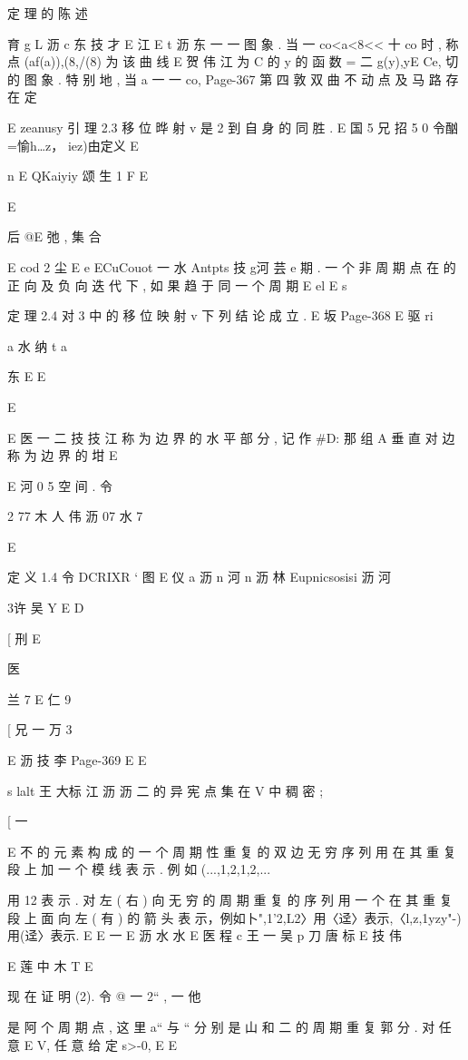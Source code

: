 {{{{{{{{{{{{{{{{{{定 理 的 陈 述

育 g
L 沥 c 东 技 才
E 江
E t 沥 东 一 一
图 象 . 当 一 co<a<8<< 十 co 时 , 称 点 (af(a)),(8,/(8) 为 该 曲 线
E 贺 伟 江
为 C 的 y 的 函 数 = 二 g(y),yE Ce, 切 的 图 象 . 特 别 地 , 当 a 一 一 co,
Page-367
第 四 敦 双 曲 不 动 点 及 马 路 存 在 定

E
zeanusy
引 理 2.3 移 位 晔 射 v 是 2 到 自 身 的 同 胜 .
E 国 5 兄 招 5
0
令酗=愉h…z， iez)由定义
E

n
E
QKaiyiy 颂 生 1
F
E

E

后 @E 弛 , 集 合

E cod 2 尘
E e
ECuCouot 一 水 Antpts 技 g河 芸 e
期 . 一 个 非 周 期 点 在 的 正 向 及 负 向 迭 代 下 , 如 果 趋 于 同 一 个 周 期
E el E
s

定 理 2.4 对 3 中 的 移 位 映 射 v 下 列 结 论 成 立 .
E 坂
Page-368
E 驱 ri

a 水 纳 t a

东
E
E

E

E 医 一 二 技
技 江
称 为 边 界 的 水 平 部 分 , 记 作 #D: 那 组 A 垂 直 对 边 称 为 边 界 的 坩
E

E 河 0 5
空 间 . 令

2 77 木 人 伟
沥 07 水 7

E

定 义 1.4 令 DCRIXR ` 图
E 仪 a 沥 n 河
n 沥 林
Eupnicsosisi 沥 河

3许 吴
Y E D

[ 刑
E

医

兰 7
E 仁 9

[ 兄 一 万 3

E 沥 技
李
Page-369
E E

s lalt 王 大标 江 沥 沥 二
的 异 宪 点 集 在 V 中 稠 密 ;

[ 一

E 不
的 元 素 构 成 的 一 个 周 期 性 重 复 的 双 边 无 穷 序 列 用 在 其 重 复 段 上 加
一 个 模 线 表 示 . 例 如 (...,1,2,1,2,...} 用 {12} 表 示 . 对 左 ( 右 ) 向 无
穷 的 周 期 重 复 的 序 列 用 一 个 在 其 重 复 段 上 面 向 左 ( 有 ) 的 箭 头 表
示，例如卜",1'2,L2〉用〈迳〉表示,〈l,z,1yzy"-)用(迳〉表示. E
E 一
E 沥 水 水
E 医 程 c 王 一 吴 p 刀 唐 标
E 技
伟

E 莲 中 木 T
E

现 在 证 明 (2). 令 @ 一 {2“ }, 一 他 } 是 阿 个 周 期 点 , 这 里 a“ 与
“ 分 别 是 山 和 二 的 周 期 重 复 郭 分 . 对 任 意 E V, 任 意 给 定 s>-0,
E E

}}}}}}}}}}}}}}}}
